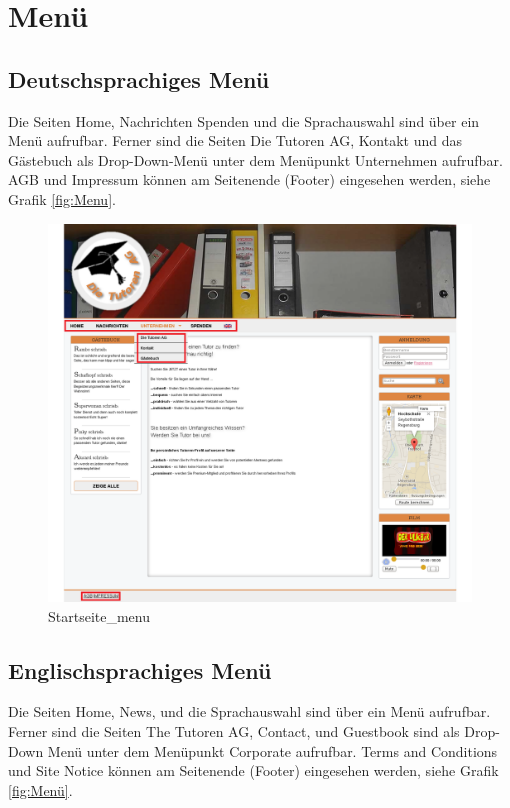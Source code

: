 
\section{Menü}

\subsection{Deutschsprachiges Menü}

Die Seiten Home, Nachrichten Spenden und die Sprachauswahl sind über ein Menü aufrufbar. Ferner sind die Seiten Die Tutoren AG, Kontakt und das Gästebuch als Drop-Down-Menü unter dem Menüpunkt Unternehmen aufrufbar. AGB und Impressum können am Seitenende (Footer) eingesehen werden, siehe Grafik \ref{fig:Menu}.

\begin{figure}[!htbp]
\centering
\includegraphics[width=1\linewidth]{../Screenshots/de/Startseite_menu}
\caption{Startseite_menu}
\label{fig:Startseite_menu}
\end{figure}

\newpage

\subsection{Englischsprachiges Menü}

 Die Seiten Home, News, und die Sprachauswahl sind über ein Menü aufrufbar. Ferner sind die Seiten The Tutoren AG, Contact,  und Guestbook sind als Drop-Down Menü unter dem Menüpunkt Corporate aufrufbar. Terms and Conditions und Site Notice können am Seitenende (Footer) eingesehen werden, siehe Grafik \ref{fig:Menü}.

